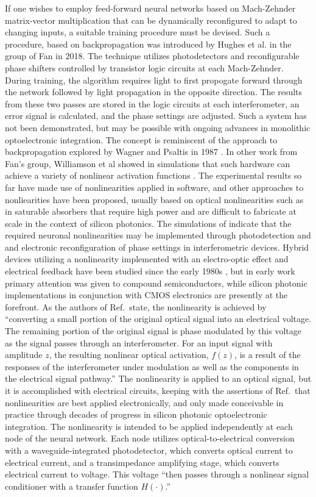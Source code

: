 If one wishes to employ feed-forward neural networks based on Mach-Zehnder matrix-vector multiplication that can be dynamically reconfigured to adapt to changing inputs, a suitable training procedure must be devised. Such a procedure, based on backpropagation was introduced by Hughes et al. in the group of Fan in 2018. The technique utilizes photodetectors and reconfigurable phase shifters controlled by transistor logic circuits at each Mach-Zehnder. During training, the algorithm requires light to first propogate forward through the network followed by light propagation in the opposite direction. The results from these two passes are stored in the logic circuits at each interferometer, an error signal is calculated, and the phase settings are adjusted. Such a system has not been demonstrated, but may be possible with ongoing advances in monolithic optoelectronic integration. The concept is reminiscent of the approach to backpropagation explored by Wagner and Psaltis in 1987 \cite{waps1987}. In other work from Fan's group, Williamson et al showed in simulations that such hardware can achieve a variety of nonlinear activation functions \cite{wihu2019}. The experimental results so far \cite{shha2017} have made use of nonlinearities applied in software, and other approaches to nonliearities have been proposed, usually based on optical nonlinearities such as in saturable absorbers that require high power and are difficult to fabricate at scale in the context of silicon photonics. The simulations of \cite{wihu2019} indicate that the required neuronal nonlinearities may be implemented through photodetection and and electronic reconfiguration of phase settings in interferometric devices. Hybrid devices utilizing a nonlinearity implemented with an electro-optic effect and electrical feedback have been studied since the early 1980s \cite{sm1980,ko1981}, but in early work primary attention was given to compound semiconductors, while silicon photonic implementations in conjunction with CMOS electronics are presently at the forefront. As the authors of Ref.\,\cite{wihu2019} state, the nonlinearity is achieved by ``converting a small portion of the original optical signal into an electrical voltage. The remaining portion of the original signal is phase modulated by this voltage as the signal passes through an interferometer. For an input signal with amplitude $z$, the resulting nonlinear optical activation, $f(z)$, is a result of the responses of the interferometer under modulation as well as the components in the electrical signal pathway.'' The nonlinearity is applied to an optical signal, but it is accomplished with electrical circuits, keeping with the assertions of Ref.\,\cite{juya1996} that nonlinearities are best applied electronically, and only made conceivable in practice through decades of progress in silicon photonic optoelectronic integration. The nonlinearity is intended to be applied independently at each node of the neural network. Each node utilizes optical-to-electrical conversion with a waveguide-integrated photodetector, which converts optical current to electrical current, and a transimpedance amplifying stage, which converts electrical current to voltage. This voltage ``then passes through a nonlinear signal conditioner with a transfer function $H(\cdot)$.'' 